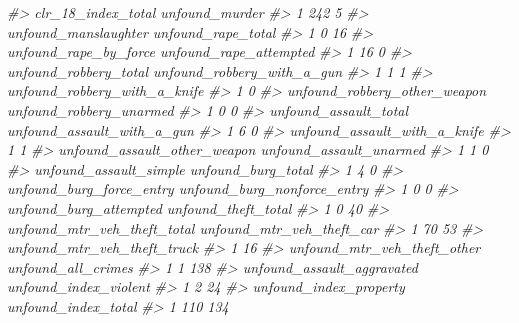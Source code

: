 \documentclass[
  12pt,
  openany]{book}
\newenvironment{Shaded}{\begin{snugshade}}{\end{snugshade}}
\newcommand{\CommentTok}[1]{\textcolor[rgb]{0.37,0.37,0.37}{\textit{#1}}}
\begin{document}
\begin{Shaded}
\begin{Highlighting}[]
\CommentTok{\#\textgreater{}   clr\_18\_index\_total unfound\_murder}
\CommentTok{\#\textgreater{} 1                242              5}
\CommentTok{\#\textgreater{}   unfound\_manslaughter unfound\_rape\_total}
\CommentTok{\#\textgreater{} 1                    0                 16}
\CommentTok{\#\textgreater{}   unfound\_rape\_by\_force unfound\_rape\_attempted}
\CommentTok{\#\textgreater{} 1                    16                      0}
\CommentTok{\#\textgreater{}   unfound\_robbery\_total unfound\_robbery\_with\_a\_gun}
\CommentTok{\#\textgreater{} 1                     1                          1}
\CommentTok{\#\textgreater{}   unfound\_robbery\_with\_a\_knife}
\CommentTok{\#\textgreater{} 1                            0}
\CommentTok{\#\textgreater{}   unfound\_robbery\_other\_weapon unfound\_robbery\_unarmed}
\CommentTok{\#\textgreater{} 1                            0                       0}
\CommentTok{\#\textgreater{}   unfound\_assault\_total unfound\_assault\_with\_a\_gun}
\CommentTok{\#\textgreater{} 1                     6                          0}
\CommentTok{\#\textgreater{}   unfound\_assault\_with\_a\_knife}
\CommentTok{\#\textgreater{} 1                            1}
\CommentTok{\#\textgreater{}   unfound\_assault\_other\_weapon unfound\_assault\_unarmed}
\CommentTok{\#\textgreater{} 1                            1                       0}
\CommentTok{\#\textgreater{}   unfound\_assault\_simple unfound\_burg\_total}
\CommentTok{\#\textgreater{} 1                      4                  0}
\CommentTok{\#\textgreater{}   unfound\_burg\_force\_entry unfound\_burg\_nonforce\_entry}
\CommentTok{\#\textgreater{} 1                        0                           0}
\CommentTok{\#\textgreater{}   unfound\_burg\_attempted unfound\_theft\_total}
\CommentTok{\#\textgreater{} 1                      0                  40}
\CommentTok{\#\textgreater{}   unfound\_mtr\_veh\_theft\_total unfound\_mtr\_veh\_theft\_car}
\CommentTok{\#\textgreater{} 1                          70                        53}
\CommentTok{\#\textgreater{}   unfound\_mtr\_veh\_theft\_truck}
\CommentTok{\#\textgreater{} 1                          16}
\CommentTok{\#\textgreater{}   unfound\_mtr\_veh\_theft\_other unfound\_all\_crimes}
\CommentTok{\#\textgreater{} 1                           1                138}
\CommentTok{\#\textgreater{}   unfound\_assault\_aggravated unfound\_index\_violent}
\CommentTok{\#\textgreater{} 1                          2                    24}
\CommentTok{\#\textgreater{}   unfound\_index\_property unfound\_index\_total}
\CommentTok{\#\textgreater{} 1                    110                 134}
\end{Highlighting}
\end{Shaded}
\end{document}
